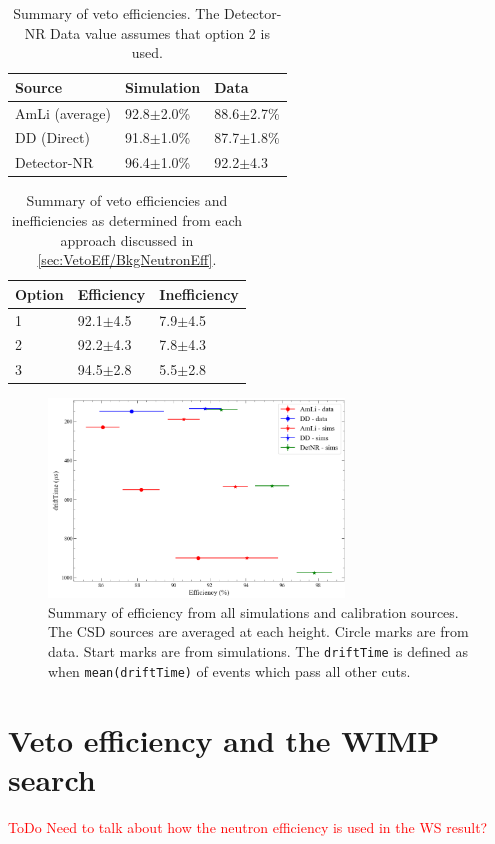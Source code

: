 \begin{table}[!ht]
	\centering
	\caption{Summary of veto efficiencies. The Detector-NR Data value assumes that option 2 is used.}
	\begin{tabular}{lll}
    \hline\hline
    \textbf{Source}& \textbf{Simulation}& \textbf{Data}\\ 
    \hline
    AmLi (average) & 92.8$\pm$2.0\% & 88.6$\pm$2.7\% \\
    DD (Direct)    & 91.8$\pm$1.0\% & 87.7$\pm$1.8\% \\
    Detector-NR    & 96.4$\pm$1.0\% & 92.2$\pm$4.3\\
    \hline\hline
	\end{tabular}
	\label{tab:VetoEff/final_veto_efficiency}
\end{table}

\begin{table}[!ht]
	\caption{Summary of veto efficiencies and inefficiencies as determined from each approach discussed in \autoref{sec:VetoEff/BkgNeutronEff}.}
	\centering
	\begin{tabular}{lll}
		\hline\hline
        \textbf{Option} & \textbf{Efficiency}& \textbf{Inefficiency} \\ 
        \hline
		1  & 92.1$\pm$4.5 & 7.9$\pm$4.5  \\
		2  & 92.2$\pm$4.3 & 7.8$\pm$4.3  \\
		3  & 94.5$\pm$2.8 & 5.5$\pm$2.8 \\
        \hline\hline
	\end{tabular}
	\label{tab:VetoEff/efficiency_options}
\end{table}

\begin{figure}[!ht]
	\centering
	\includegraphics[width=0.7\textwidth]{figures/VetoEfficiency/efficiency_summary.png}
	\caption{Summary of efficiency from all simulations and calibration sources.
		The CSD sources are averaged at each height.
		Circle marks are from data.
		Start marks are from simulations.
		The \lstinline{driftTime} is defined as when \lstinline{mean(driftTime)} of events which pass all other cuts.
	}
	\label{fig:VetoEff/efficiency_summary}
\end{figure}

\section{Veto efficiency and the WIMP search}\label{sec:VetoEff4WIMPSearch}
\textcolor{red}{ToDo Need to talk about how the neutron efficiency is used in the WS result?}